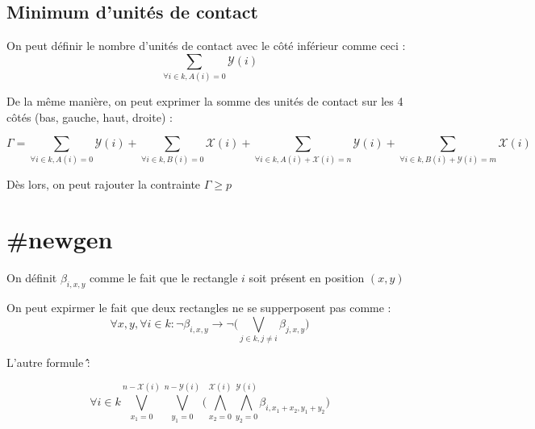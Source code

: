 \documentclass[a4paper]{article}
\begin{document}
\subsection{Minimum d'unités de contact}

On peut définir le nombre d'unités de contact avec le côté inférieur comme ceci :
$$
\sum_{\forall i \in k, A(i) = 0} \mathcal{Y}(i)
$$

De la même manière, on peut exprimer la somme des unités de contact sur les 4 côtés (bas, gauche, haut, droite) :

$$
\Gamma = \sum_{\forall i \in k, A(i) = 0} \mathcal{Y}(i) +
\sum_{\forall i \in k, B(i) = 0} \mathcal{X}(i) +
\sum_{\forall i \in k, A(i) + \mathcal{X}(i) =  n} \mathcal{Y}(i) +
\sum_{\forall i \in k, B(i) + \mathcal{Y}(i) = m} \mathcal{X}(i)
$$

Dès lors, on peut rajouter la contrainte $\Gamma \geq p$


\section{\#newgen}

On définit $\beta_{i, x, y}$ comme le fait que le rectangle $i$ soit présent en position $(x,y)$

On peut expirmer le fait que deux rectangles ne se supperposent pas comme : $$
\forall x,y , \forall i \in k : \lnot \beta_{i, x, y} \rightarrow
\lnot \Big( \bigvee_{j \in k, j \neq i} \beta_{j, x, y} \Big)
$$

L'autre formule \^\^ :

$$
\forall i \in k \bigvee_{x_1=0}^{n-\mathcal{X}(i)} \bigvee_{y_1=0}^{n-\mathcal{Y}(i)}
\Big(
  \bigwedge_{x_2=0}^{\mathcal{X}(i)} \bigwedge_{y_2=0}^{\mathcal{Y}(i)} \beta_{i, x_1 + x_2, y_1 + y_2}
\Big)
$$
\end{document}
